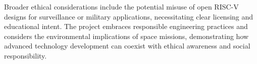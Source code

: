 \documentclass[10pt,twocolumn]{article}
\begin{document}
Broader ethical considerations include the potential misuse of open RISC-V designs for surveillance or military applications, necessitating clear licensing and educational intent. The project embraces responsible engineering practices and considers the environmental implications of space missions, demonstrating how advanced technology development can coexist with ethical awareness and social responsibility.
\end{document}
